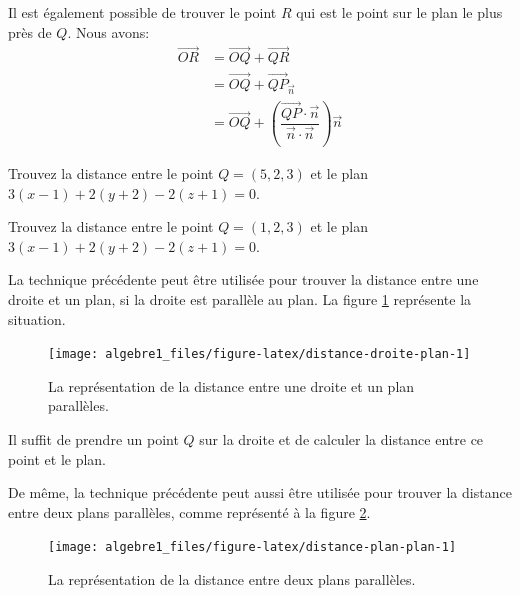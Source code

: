 \documentclass[]{book}
\theoremstyle{definition}
\theoremstyle{definition}
\theoremstyle{definition}
\theoremstyle{remark}
\let\BeginKnitrBlock\begin \let\EndKnitrBlock\end
\begin{document}
Il est également possible de trouver le point \(R\) qui est le point sur le plan le plus près de \(Q\). Nous avons:
\begin{align*}
\overrightarrow{OR} &= \overrightarrow{OQ}+\overrightarrow{QR} \\
&= \overrightarrow{OQ}+\overrightarrow{QP}_{\overrightarrow{n}} \\
&= \overrightarrow{OQ}+\left(\dfrac{\overrightarrow{QP}\cdot \vec n}{\vec n \cdot \vec n}\right)\vec n
\end{align*}

\BeginKnitrBlock{example}
\protect\hypertarget{exm:unnamed-chunk-235}{}{\label{exm:unnamed-chunk-235} }Trouvez la distance entre le point \(Q=(5,2,3)\) et le plan \(3(x-1)+2(y+2)-2(z+1)=0\).
\EndKnitrBlock{example}

\BeginKnitrBlock{example}
\protect\hypertarget{exm:unnamed-chunk-236}{}{\label{exm:unnamed-chunk-236} }Trouvez la distance entre le point \(Q=(1,2,3)\) et le plan \(3(x-1)+2(y+2)-2(z+1)=0\).
\EndKnitrBlock{example}

La technique précédente peut être utilisée pour trouver la distance entre une droite et un plan, si la droite est parallèle au plan. La figure \ref{fig:distance-droite-plan} représente la situation.

\begin{figure}

{\centering \texttt{[image: algebre1\_files/figure-latex/distance-droite-plan-1]} 

}

\caption{La représentation de la distance entre une droite et un plan parallèles.}\label{fig:distance-droite-plan}
\end{figure}

Il suffit de prendre un point \(Q\) sur la droite et de calculer la distance entre ce point et le plan.

De même, la technique précédente peut aussi être utilisée pour trouver la distance entre deux plans parallèles, comme représenté à la figure \ref{fig:distance-plan-plan}.

\begin{figure}

{\centering \texttt{[image: algebre1\_files/figure-latex/distance-plan-plan-1]} 

}

\caption{La représentation de la distance entre deux plans parallèles.}\label{fig:distance-plan-plan}
\end{figure}
\end{document}
